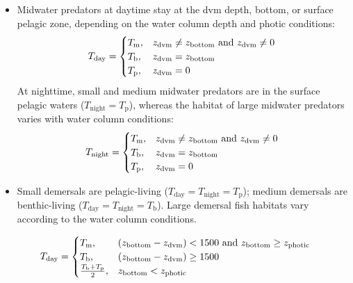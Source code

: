 \documentclass[
]{article}
\begin{document}
\begin{itemize}
\item
  Midwater predators at daytime stay at the dvm depth, bottom, or
  surface pelagic zone, depending on the water column depth and photic
  conditions: \begin{equation}
   T_{\mathrm{day}} =
  \begin{cases}
     T_{\mathrm{m}}, & \text{$ z_{\mathrm{dvm}} \neq z_{\mathrm{bottom}} $ and $ z_{\mathrm{dvm}} \neq 0 $ } \\
     T_{\mathrm{b}}, & \text{$ z_{\mathrm{dvm}} = z_{\mathrm{bottom}} $} \\
     T_{\mathrm{p}}, & \text{$ z_{\mathrm{dvm}} = 0 $} 
  \end{cases}
  \label{eq:xxxxxxx2}
  \end{equation} At nighttime, small and medium midwater predators are
  in the surface pelagic waters (\(T_{\mathrm{night}}=T_{\mathrm{p}}\)),
  whereas the habitat of large midwater predators varies with water
  column conditions: \begin{equation}
   T_{\mathrm{night}} =
  \begin{cases}
     T_{\mathrm{m}}, & \text{$ z_{\mathrm{dvm}} \neq z_{\mathrm{bottom}} $ and $ z_{\mathrm{dvm}} \neq 0 $ } \\
     T_{\mathrm{b}}, & \text{$ z_{\mathrm{dvm}} = z_{\mathrm{bottom}} $} \\
     T_{\mathrm{p}}, & \text{$ z_{\mathrm{dvm}} = 0 $}  
  \end{cases}
  \label{eq:xxxxxx}
  \end{equation}
\item
  Small demersals are pelagic-living
  (\(T_{\mathrm{day}}=T_{\mathrm{night}}=T_{\mathrm{p}}\)); medium
  demersals are benthic-living
  (\(T_{\mathrm{day}}=T_{\mathrm{night}}=T_{\mathrm{b}}\)). Large
  demersal fish habitats vary according to the water column conditions.
\end{itemize}

\begin{equation}
 T_{\mathrm{day}} =
  \begin{cases}
     T_{\mathrm{m}}, & \text{$ (z_{\mathrm{bottom}} - z_{\mathrm{dvm}}) < 1500 $ and $ z_{\mathrm{bottom}} \geq z_{\mathrm{photic}} $} \\
     T_{\mathrm{b}}, & \text{$ (z_{\mathrm{bottom}} - z_{\mathrm{dvm}}) \geq 1500 $ } \\
     \frac{T_{\mathrm{b}}+T_{\mathrm{p}}}{2}, & \text{$ z_{\mathrm{bottom}} < z_{\mathrm{photic}} $} 
  \end{cases}
\label{eq:xxxxxx2}
\end{equation}
\end{document}
